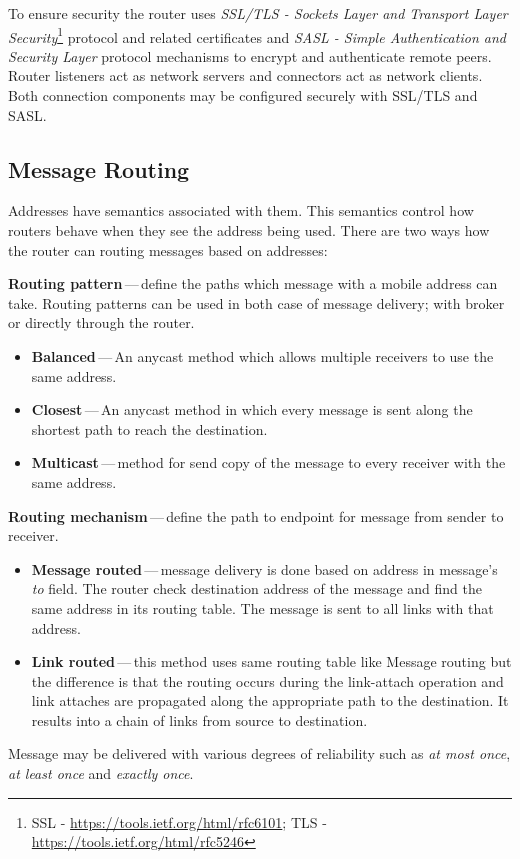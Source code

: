 
To ensure security the router uses \emph{SSL/TLS - Sockets Layer and Transport Layer Security}\footnote{SSL - \url{https://tools.ietf.org/html/rfc6101}; TLS - \url{https://tools.ietf.org/html/rfc5246}} protocol and related certificates and \emph{SASL - Simple Authentication and Security Layer}\footnotemark{} protocol mechanisms to encrypt and authenticate remote peers. Router listeners act as network servers and connectors act as network clients. Both connection components may be configured securely with SSL/TLS and SASL.



\subsection{Message Routing}
\label{Message Routing}
Addresses have semantics associated with them. This semantics control how routers behave when they see the address being used. There are two ways how the router can routing messages based on addresses:

\begin{description}
	\setlength\itemsep{0em}
	\item \textbf{Routing pattern}\,---\,define the paths which message with a mobile address can take. Routing patterns can be used in both case of message delivery; with broker or directly through the router.
	\begin{itemize}
		\setlength\itemsep{0em}
		\item \textbf{Balanced}\,---\,An anycast\footnotemark{} method which allows multiple receivers to use the same address.
		\item \textbf{Closest}\,---\,An anycast method in which every message is sent along the shortest path to reach the destination.
		\item \textbf{Multicast}\,---\,method for send copy of the message to every receiver with the same address.
	\end{itemize}
	\item \textbf{Routing mechanism}\,---\,define the path to endpoint for message from sender to receiver.
	\begin{itemize}
		\setlength\itemsep{0em}
		\item \textbf{Message routed}\,---\,message delivery is done based on address in message's \emph{to} field. The router check destination address of the message and find the same address in its routing table. The message is sent to all links with that address.
		\item \textbf{Link routed}\,---\,this method uses same routing table like Message routing but the difference is that the routing occurs during the link-attach operation and link attaches are propagated along the appropriate path to the destination. It results into a chain of links from source to destination.
	\end{itemize}
\end{description}
Message may be delivered with various degrees of reliability such as \emph{at most once}, \emph{at least once} and \emph{exactly once}.


